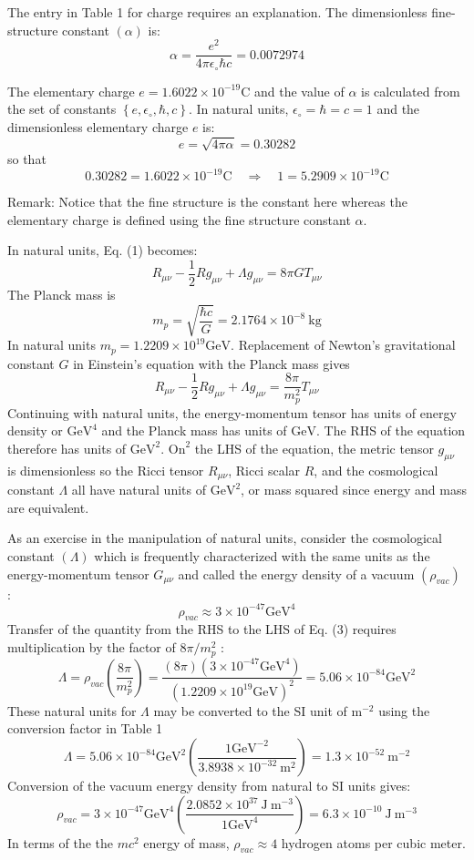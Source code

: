 \documentclass[main.tex]{subfiles}
\begin{document}
The entry in Table 1 for charge requires an explanation. The dimensionless fine-structure constant $(\alpha)$ is:
$$
\alpha=\frac{e^2}{4 \pi \epsilon_{\circ} \hbar c}=0.0072974
$$

The elementary charge $e=1.6022 \times 10^{-19} \mathrm{C}$ and the value of $\alpha$ is calculated from the set of constants $\left\{e, \epsilon_{\circ}, \hbar, c\right\}$. In natural units, $\epsilon_{\circ}=\hbar=c=1$ and the dimensionless elementary charge $e$ is:
$$
e=\sqrt{4 \pi \alpha}=0.30282
$$
so that
$$
0.30282=1.6022 \times 10^{-19} \mathrm{C} \quad \Longrightarrow \quad 1=5.2909 \times 10^{-19} \mathrm{C}
$$

Remark: Notice that the fine structure is the constant here whereas the elementary charge is defined using the fine structure constant $\alpha$. 

In natural units, Eq. (1) becomes:
$$
R_{\mu \nu}-\frac{1}{2} R g_{\mu \nu}+\Lambda g_{\mu \nu}=8 \pi G T_{\mu \nu}
$$
The Planck mass is
$$
m_p=\sqrt{\frac{\hbar c}{G}}=2.1764 \times 10^{-8} \mathrm{~kg}
$$
In natural units $m_p=1.2209 \times 10^{19} \mathrm{GeV}$. Replacement of Newton's gravitational constant $G$ in Einstein's equation with the Planck mass gives
$$
R_{\mu \nu}-\frac{1}{2} R g_{\mu \nu}+\Lambda g_{\mu \nu}=\frac{8 \pi}{m_p^2} T_{\mu \nu}
$$
Continuing with natural units, the energy-momentum tensor has units of energy density or $\mathrm{GeV}^4$ and the Planck mass has units of $\mathrm{GeV}$. The RHS of the equation therefore has units of $\mathrm{GeV}^2$. $\mathrm{On}^2$ the LHS of the equation, the metric tensor $g_{\mu \nu}$ is dimensionless so the Ricci tensor $R_{\mu \nu}$, Ricci scalar $R$, and the cosmological constant $\Lambda$ all have natural units of $\mathrm{GeV}^2$, or mass squared since energy and mass are equivalent.

As an exercise in the manipulation of natural units, consider the cosmological constant $(\Lambda)$ which is frequently characterized with the same units as the energy-momentum tensor $G_{\mu \nu}$ and called the energy density of a vacuum $\left(\rho_{v a c}\right)$ :
$$
\rho_{v a c} \approx 3 \times 10^{-47} \mathrm{GeV}^4
$$
Transfer of the quantity from the RHS to the LHS of Eq. (3) requires multiplication by the factor of $8 \pi / m_p^2$ :
$$
\Lambda=\rho_{v a c}\left(\frac{8 \pi}{m_p^2}\right)=\frac{(8 \pi)\left(3 \times 10^{-47} \mathrm{GeV}^4\right)}{\left(1.2209 \times 10^{19} \mathrm{GeV}\right)^2}=5.06 \times 10^{-84} \mathrm{GeV}^2
$$
These natural units for $\Lambda$ may be converted to the SI unit of $\mathrm{m}^{-2}$ using the conversion factor in Table 1
$$
\Lambda=5.06 \times 10^{-84} \mathrm{GeV}^2\left(\frac{1 \mathrm{GeV}^{-2}}{3.8938 \times 10^{-32} \mathrm{~m}^2}\right)=1.3 \times 10^{-52} \mathrm{~m}^{-2}
$$
Conversion of the vacuum energy density from natural to SI units gives:
$$
\rho_{v a c}=3 \times 10^{-47} \mathrm{GeV}^4\left(\frac{2.0852 \times 10^{37} \mathrm{~J} \mathrm{~m}^{-3}}{1 \mathrm{GeV}^4}\right)=6.3 \times 10^{-10} \mathrm{~J} \mathrm{~m}^{-3}
$$
In terms of the the $m c^2$ energy of mass, $\rho_{v a c} \approx 4$ hydrogen atoms per cubic meter.
\end{document}
